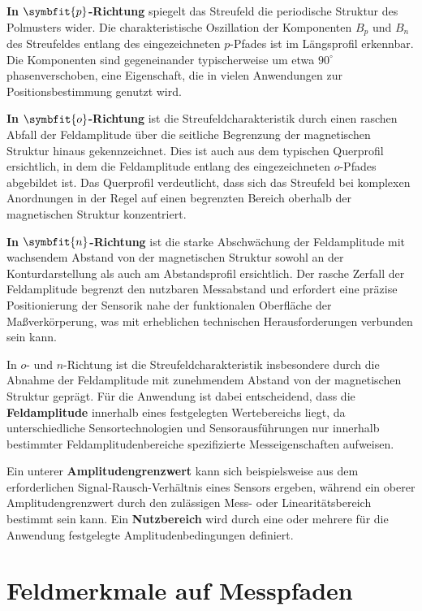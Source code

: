 \documentclass[
  ngerman,
  a4paper,
  twoside]{scrbook}
\begin{document}
\textbf{In} \(\symbfit{p}\)\textbf{-Richtung} spiegelt das Streufeld die
periodische Struktur des Polmusters wider. Die charakteristische
Oszillation der Komponenten \(B_p\) und \(B_n\) des Streufeldes entlang
des eingezeichneten \(p\)-Pfades ist im Längsprofil erkennbar. Die
Komponenten sind gegeneinander typischerweise um etwa \(90^\circ\)
phasenverschoben, eine Eigenschaft, die in vielen Anwendungen zur
Positionsbestimmung genutzt wird.

\textbf{In} \(\symbfit{o}\)\textbf{-Richtung} ist die
Streufeldcharakteristik durch einen raschen Abfall der Feldamplitude
über die seitliche Begrenzung der magnetischen Struktur hinaus
gekennzeichnet. Dies ist auch aus dem typischen Querprofil ersichtlich,
in dem die Feldamplitude entlang des eingezeichneten \(o\)-Pfades
abgebildet ist. Das Querprofil verdeutlicht, dass sich das Streufeld bei
komplexen Anordnungen in der Regel auf einen begrenzten Bereich oberhalb
der magnetischen Struktur konzentriert.

\textbf{In} \(\symbfit{n}\)\textbf{-Richtung} ist die starke
Abschwächung der Feldamplitude mit wachsendem Abstand von der
magnetischen Struktur sowohl an der Konturdarstellung als auch am
Abstandsprofil ersichtlich. Der rasche Zerfall der Feldamplitude
begrenzt den nutzbaren Messabstand und erfordert eine präzise
Positionierung der Sensorik nahe der funktionalen Oberfläche der
Maßverkörperung, was mit erheblichen technischen Herausforderungen
verbunden sein kann.

In \(o\)- und \(n\)-Richtung ist die Streufeldcharakteristik
insbesondere durch die Abnahme der Feldamplitude mit zunehmendem Abstand
von der magnetischen Struktur geprägt. Für die Anwendung ist dabei
entscheidend, dass die \textbf{Feldamplitude} innerhalb eines
festgelegten Wertebereichs liegt, da unterschiedliche Sensortechnologien
und Sensorausführungen nur innerhalb bestimmter Feldamplitudenbereiche
spezifizierte Messeigenschaften aufweisen.

Ein unterer \textbf{Amplitudengrenzwert} kann sich beispielsweise aus
dem erforderlichen Signal-Rausch-Verhältnis eines Sensors ergeben,
während ein oberer Amplitudengrenzwert durch den zulässigen Mess- oder
Linearitätsbereich bestimmt sein kann. Ein \textbf{Nutzbereich} wird
durch eine oder mehrere für die Anwendung festgelegte
Amplitudenbedingungen definiert.

\section{Feldmerkmale auf
Messpfaden}\label{sec-05-feldmerkmale_auf_messpfaden}
\end{document}

